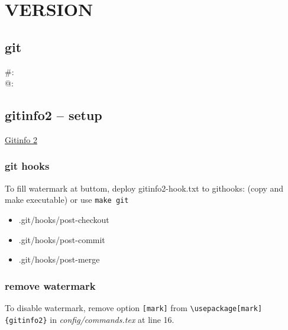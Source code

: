     \section{VERSION}
    \subsection{git}
    \#: \gitAbbrevHash\\
    @: \gitAuthorIsoDate\\
    \gitReferences
    \subsection{gitinfo2 -- setup}
    \href{https://www.ctan.org/tex-archive/macros/latex/contrib/gitinfo2}{Gitinfo 2}
    \subsubsection{git hooks}
    To fill watermark at buttom, deploy gitinfo2-hook.txt to githooks: (copy and make executable) or use \texttt{make git}
    \begin{itemize}
        \item .git/hooks/post-checkout
        \item .git/hooks/post-commit
        \item .git/hooks/post-merge
    \end{itemize}
    \subsubsection{remove watermark}
    To disable watermark, remove option \lstinline|[mark]| from \lstinline|\usepackage[mark]{gitinfo2}| in \textit{config/commands.tex} at line 16.
